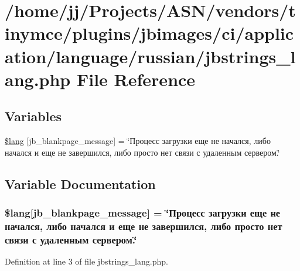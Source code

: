 \hypertarget{russian_2jbstrings__lang_8php}{}\section{/home/jj/\+Projects/\+A\+S\+N/vendors/tinymce/plugins/jbimages/ci/application/language/russian/jbstrings\+\_\+lang.php File Reference}
\label{russian_2jbstrings__lang_8php}
\subsection*{Variables}
\begin{DoxyCompactItemize}
\item 
\hyperlink{russian_2jbstrings__lang_8php_a940d854d6735a1c346b18d7692b81d72}{\$lang} \mbox{[}\textquotesingle{}jb\+\_\+blankpage\+\_\+message\textquotesingle{}\mbox{]} = \char`\"{}Процесс загрузки еще не начался, либо начался и еще не завершился, либо просто нет связи с удаленным сервером.\char`\"{}
\end{DoxyCompactItemize}


\subsection{Variable Documentation}
\subsubsection[{\texorpdfstring{\$lang}{$lang}}]{\setlength{\rightskip}{0pt plus 5cm}\$lang\mbox{[}\textquotesingle{}jb\+\_\+blankpage\+\_\+message\textquotesingle{}\mbox{]} = \char`\"{}Процесс загрузки еще не начался, либо начался и еще не завершился, либо просто нет связи с удаленным сервером.\char`\"{}}\hypertarget{russian_2jbstrings__lang_8php_a940d854d6735a1c346b18d7692b81d72}{}\label{russian_2jbstrings__lang_8php_a940d854d6735a1c346b18d7692b81d72}


Definition at line 3 of file jbstrings\+\_\+lang.\+php.

